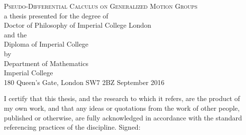 \begin{titlepage}
\begin{center}
\null\vfill
{\LARGE{\textsc{Pseudo-Differential Calculus on Generalized Motion Groups}}}
\\
\vfill
{\sc \footnotesize
{\sc a thesis presented for the degree of}\\
Doctor of Philosophy of Imperial College London\\
{\sc and the}\\
Diploma of Imperial College\\
{\sc by} \\
}
{\large{}}
\vfill\vfill\vfill
{\sc \footnotesize{
Department of Mathematics\\
Imperial College \\
180 Queen's Gate, London SW7 2BZ}
\vfill
{{September 2016}}
}
\end{center}
\end{titlepage}

\newpage
\hphantom{1}
\vfill
\noindent I certify that this thesis, and the research to which it refers,
are the product of my own work, and that any ideas or quotations from the
work of other people, published or otherwise, are fully acknowledged in accordance
with the standard referencing practices of the discipline.
\vfill
{\hfill Signed: \hrulefill}
\vfill
